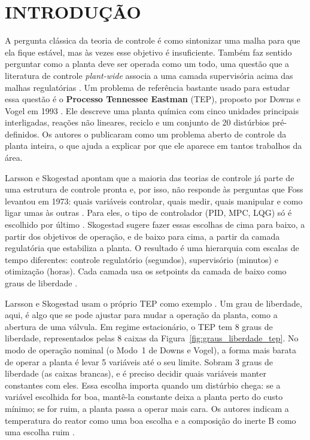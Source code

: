 \chapter[INTRODUÇÃO]{INTRODUÇÃO}

A pergunta clássica da teoria de controle é como sintonizar uma malha para que ela fique estável, mas às vezes esse objetivo é insuficiente. Também faz sentido perguntar como a planta deve ser operada como um todo, uma questão que a literatura de controle \textit{plant-wide} associa a uma camada supervisória acima das malhas regulatórias \cite{Larsson2000, Skogestad2004}. Um problema de referência bastante usado para estudar essa questão é o \textbf{Processo Tennessee Eastman} (TEP), proposto por Downs e Vogel em 1993 \cite{DOWNS1993}. Ele descreve uma planta química com cinco unidades principais interligadas, reações não lineares, reciclo e um conjunto de 20 distúrbios pré-definidos. Os autores o publicaram como um problema aberto de controle da planta inteira, o que ajuda a explicar por que ele aparece em tantos trabalhos da área.

Larsson e Skogestad apontam que a maioria das teorias de controle já parte de uma estrutura de controle pronta e, por isso, não responde às perguntas que Foss levantou em 1973: quais variáveis controlar, quais medir, quais manipular e como ligar umas às outras \cite{Larsson2000}. Para eles, o tipo de controlador (PID, MPC, LQG) só é escolhido por último \cite{Skogestad2004}. Skogestad sugere fazer essas escolhas de cima para baixo, a partir dos objetivos de operação, e de baixo para cima, a partir da camada regulatória que estabiliza a planta. O resultado é uma hierarquia com escalas de tempo diferentes: controle regulatório (segundos), supervisório (minutos) e otimização (horas). Cada camada usa os setpoints da camada de baixo como graus de liberdade \cite{Larsson2000, Skogestad2004}. 

Larsson e Skogestad usam o próprio TEP como exemplo \cite{Larsson2000}. Um grau de liberdade, aqui, é algo que se pode ajustar para mudar a operação da planta, como a abertura de uma válvula. Em regime estacionário, o TEP tem 8 graus de liberdade, representados pelas 8 caixas da Figura~\ref{fig:graus_liberdade_tep}. No modo de operação nominal (o Modo~1 de Downs e Vogel), a forma mais barata de operar a planta é levar 5 variáveis até o seu limite. Sobram 3 graus de liberdade (as caixas brancas), e é preciso decidir quais variáveis manter constantes com eles. Essa escolha importa quando um distúrbio chega: se a variável escolhida for boa, mantê-la constante deixa a planta perto do custo mínimo; se for ruim, a planta passa a operar mais cara. Os autores indicam a temperatura do reator como uma boa escolha e a composição do inerte B como uma escolha ruim \cite{Larsson2000}.

